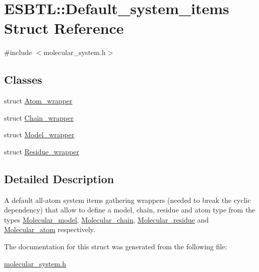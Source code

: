 \hypertarget{structESBTL_1_1Default__system__items}{}\section{E\+S\+B\+TL\+:\+:Default\+\_\+system\+\_\+items Struct Reference}
\label{structESBTL_1_1Default__system__items}


{\ttfamily \#include $<$molecular\+\_\+system.\+h$>$}

\subsection*{Classes}
\begin{DoxyCompactItemize}
\item 
struct \hyperlink{structESBTL_1_1Default__system__items_1_1Atom__wrapper}{Atom\+\_\+wrapper}
\item 
struct \hyperlink{structESBTL_1_1Default__system__items_1_1Chain__wrapper}{Chain\+\_\+wrapper}
\item 
struct \hyperlink{structESBTL_1_1Default__system__items_1_1Model__wrapper}{Model\+\_\+wrapper}
\item 
struct \hyperlink{structESBTL_1_1Default__system__items_1_1Residue__wrapper}{Residue\+\_\+wrapper}
\end{DoxyCompactItemize}


\subsection{Detailed Description}
A default all-\/atom system items gathering wrappers (needed to break the cyclic dependency) that allow to define a model, chain, residue and atom type from the types \hyperlink{classESBTL_1_1Molecular__model}{Molecular\+\_\+model}, \hyperlink{classESBTL_1_1Molecular__chain}{Molecular\+\_\+chain}, \hyperlink{classESBTL_1_1Molecular__residue}{Molecular\+\_\+residue} and \hyperlink{classESBTL_1_1Molecular__atom}{Molecular\+\_\+atom} respectively. 

The documentation for this struct was generated from the following file\+:\begin{DoxyCompactItemize}
\item 
\hyperlink{molecular__system_8h}{molecular\+\_\+system.\+h}\end{DoxyCompactItemize}
